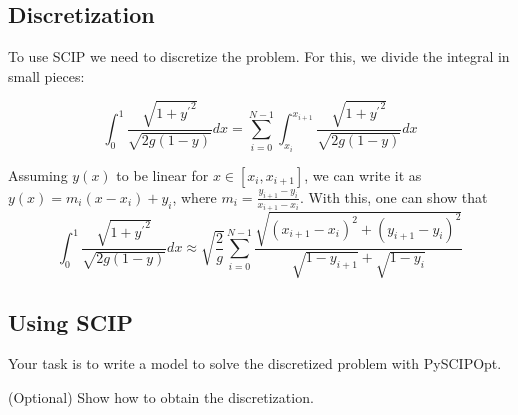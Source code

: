\documentclass[12pt]{article}
\begin{document}
\subsection*{Discretization}

To use SCIP we need to discretize the problem.
For this, we divide the integral in small pieces:

\[
    \int_0^1 \frac{\sqrt{1 + {y^{'}}^2}}{\sqrt{2g(1 - y)}} dx = \sum_{i = 0}^{N-1} \int_{x_i}^{x_{i+1}} \frac{\sqrt{1 + {y^{'}}^2}}{\sqrt{2g(1 - y)}} dx
\]

Assuming $y(x)$ to be linear for $x \in [x_i, x_{i+1}]$, we can write it as $y(x) = m_i (x - x_i) + y_i$,
where $m_i = \tfrac{y_{i+1} - y_i}{x_{i+1} - x_i}$.
With this, one can show that
%
%
\[
    \int_0^1 \frac{\sqrt{1 + {y^{'}}^2}}{\sqrt{2g(1 - y)}} dx
    \approx
    \sqrt{\frac{2}{g}} \sum_{i = 0}^{N-1} \frac{\sqrt{(x_{i+1} - x_i)^2 + (y_{i+1} - y_i)^2}}{\sqrt{1 - y_{i+1}} + \sqrt{1 - y_{i}}}
\]

\subsection*{Using SCIP}

Your task is to write a model to solve the discretized problem with PySCIPOpt.

(Optional) Show how to obtain the discretization.
\end{document}
